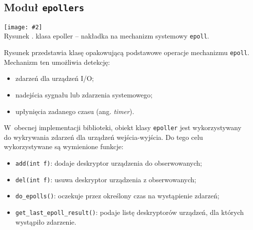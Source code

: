 \documentclass[12pt]{mwart}
\newcommand{\code}{\texttt}
\newcommand{\procbr}{()}
\newcounter{figmain}
\newcommand{\myownfigure}[4]{ \newcounter{#1} \setcounter{#1}{\value{figmain}} \addtocounter{figmain}{1} \begin{center} \label{fig:#1} \centering \texttt{[image: \#2]}\\ \nopagebreak[4] Rysunek \arabic{#1}. #3. \end{center}}
\begin{document}
\subsection{Moduł \code{epollers}}
  \myownfigure{Epoller}{Epoller.png}{klasa epoller -- nakładka na mechanizm systemowy \code{epoll}}{.7}
\indent
  Rysunek  przedstawia klasę opakowującą podstawowe operacje mechanizmu \code{epoll}.
  Mechanizm ten umożliwia detekcję:
  \begin{itemize}
    \item zdarzeń dla urządzeń I/O;
    \item nadejścia sygnału lub zdarzenia systemowego;
    \item upłynięcia zadanego czasu (ang. \emph{timer}).
  \end{itemize}
  W~obecnej implementacji biblioteki, obiekt klasy \code{epoller} jest wykorzystywany do wykrywania zdarzeń dla urządzeń wejścia-wyjścia.
  Do tego celu wykorzystywane są wymienione funkcje:
  \begin{itemize}
    \item \code{add(int f)}: dodaje deskryptor urządzenia do obserwowanych;
    \item \code{del(int f)}: usuwa deskryptor urządzenia z obserwowanych;
    \item \code{do\_epolls\procbr}: oczekuje przez określony czas na wystąpienie zdarzeń;
    \item \code{get\_last\_epoll\_result\procbr}: podaje listę deskryptorów urządzeń, dla których wystąpiło zdarzenie.
  \end{itemize}
\par
%
\end{document}
